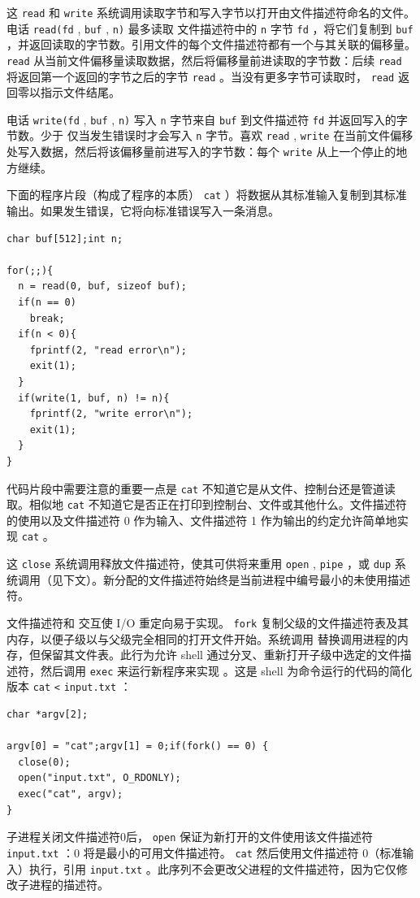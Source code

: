 \documentclass[UTF8]{article}
\begin{document}
这
    \lstinline{read}    和
    \lstinline{write}    系统调用读取字节和写入字节以打开由文件描述符命名的文件。电话
    \lstinline{read(fd}    ,
    \lstinline{buf}    ,
    \lstinline{n)}    最多读取
 文件描述符中的    \lstinline{n}    字节
    \lstinline{fd}    ，将它们复制到
    \lstinline{buf}    ，并返回读取的字节数。引用文件的每个文件描述符都有一个与其关联的偏移量。
    \lstinline{read}    从当前文件偏移量读取数据，然后将偏移量前进读取的字节数：后续
    \lstinline{read}    将返回第一个返回的字节之后的字节
    \lstinline{read}    。当没有更多字节可读取时，
    \lstinline{read}    返回零以指示文件结尾。  

电话
    \lstinline{write(fd}    ,
    \lstinline{buf}    ,
    \lstinline{n)}    写入
    \lstinline{n}    字节来自
    \lstinline{buf}    到文件描述符
    \lstinline{fd}    并返回写入的字节数。少于
 仅当发生错误时才会写入    \lstinline{n}    字节。喜欢
    \lstinline{read}    ,
    \lstinline{write}    在当前文件偏移处写入数据，然后将该偏移量前进写入的字节数：每个
    \lstinline{write}    从上一个停止的地方继续。  

下面的程序片段（构成了程序的本质）
    \lstinline{cat}    ）将数据从其标准输入复制到其标准输出。如果发生错误，它将向标准错误写入一条消息。
    \begin{lstlisting}[]char buf[512];int n;

for(;;){
  n = read(0, buf, sizeof buf);
  if(n == 0)
    break;
  if(n < 0){
    fprintf(2, "read error\n");
    exit(1);
  }
  if(write(1, buf, n) != n){
    fprintf(2, "write error\n");
    exit(1);
  }
}
\end{lstlisting}    代码片段中需要注意的重要一点是
    \lstinline{cat}    不知道它是从文件、控制台还是管道读取。相似地
    \lstinline{cat}    不知道它是否正在打印到控制台、文件或其他什么。文件描述符的使用以及文件描述符 0 作为输入、文件描述符 1 作为输出的约定允许简单地实现
    \lstinline{cat}    。  

这
    \lstinline{close}    系统调用释放文件描述符，使其可供将来重用
    \lstinline{open}    ,
    \lstinline{pipe}   ，或
    \lstinline{dup}    系统调用（见下文）。新分配的文件描述符始终是当前进程中编号最小的未使用描述符。  

文件描述符和
        交互使 I/O 重定向易于实现。
    \lstinline{fork}    复制父级的文件描述符表及其内存，以便子级以与父级完全相同的打开文件开始。系统调用
        替换调用进程的内存，但保留其文件表。此行为允许 shell 通过分叉、重新打开子级中选定的文件描述符，然后调用    \lstinline{exec}    来运行新程序来实现       。这是 shell 为命令运行的代码的简化版本
    \lstinline{cat}   
    \lstinline{<}   
    \lstinline{input.txt}   ：
    \begin{lstlisting}[]char *argv[2];

argv[0] = "cat";argv[1] = 0;if(fork() == 0) {
  close(0);
  open("input.txt", O_RDONLY);
  exec("cat", argv);
}
\end{lstlisting}    子进程关闭文件描述符0后，
    \lstinline{open}    保证为新打开的文件使用该文件描述符
    \lstinline{input.txt}    ：0 将是最小的可用文件描述符。
    \lstinline{cat}    然后使用文件描述符 0（标准输入）执行，引用
    \lstinline{input.txt}    。此序列不会更改父进程的文件描述符，因为它仅修改子进程的描述符。  
\end{document}
